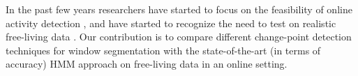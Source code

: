 In the past few years researchers have started to focus on the feasibility of
online activity detection \cite{gu09} \cite{keogh01} \cite{wu09}, and have
started to recognize the need to test on realistic free-living data \cite{kwapitz10}
\cite{strohrmann11}. Our contribution is to compare different change-point detection
techniques for window segmentation with the state-of-the-art (in terms of
accuracy) HMM approach on free-living data in an online setting.
